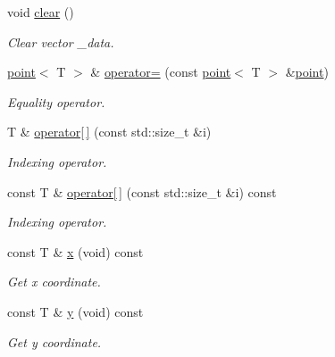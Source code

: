\begin{DoxyCompactItemize}
\mbox{\label{classddd_1_1point_ade1021a86b26ec7212cb83ebfd3b711f}} 
void \hyperlink{classddd_1_1point_ade1021a86b26ec7212cb83ebfd3b711f}{clear} ()
\begin{DoxyCompactList}\small\item\em Clear vector \+\_\+data. \end{DoxyCompactList}\item 
\hyperlink{classddd_1_1point}{point}$<$ T $>$ \& \hyperlink{classddd_1_1point_a91411a7306df6d56b5dff774ae1affea}{operator=} (const \hyperlink{classddd_1_1point}{point}$<$ T $>$ \&\hyperlink{classddd_1_1point}{point})
\begin{DoxyCompactList}\small\item\em Equality operator. \end{DoxyCompactList}\item 
T \& \hyperlink{classddd_1_1point_aabf1454e1f0496fb70c1e62852aa2595}{operator\mbox{[}$\,$\mbox{]}} (const std\+::size\+\_\+t \&i)
\begin{DoxyCompactList}\small\item\em Indexing operator. \end{DoxyCompactList}\item 
const T \& \hyperlink{classddd_1_1point_a320e2bfca11915c5ebb9ed0581a3cab1}{operator\mbox{[}$\,$\mbox{]}} (const std\+::size\+\_\+t \&i) const
\begin{DoxyCompactList}\small\item\em Indexing operator. \end{DoxyCompactList}\item 
\mbox{\label{classddd_1_1point_af165c07ef348f3d795469b8b0918a3ba}} 
const T \& \hyperlink{classddd_1_1point_af165c07ef348f3d795469b8b0918a3ba}{x} (void) const
\begin{DoxyCompactList}\small\item\em Get x coordinate. \end{DoxyCompactList}\item 
\mbox{\label{classddd_1_1point_a632f731dfcc4cc1693948d861cb7327d}} 
const T \& \hyperlink{classddd_1_1point_a632f731dfcc4cc1693948d861cb7327d}{y} (void) const
\begin{DoxyCompactList}\small\item\em Get y coordinate. \end{DoxyCompactList}\item 

\end{DoxyCompactItemize}
